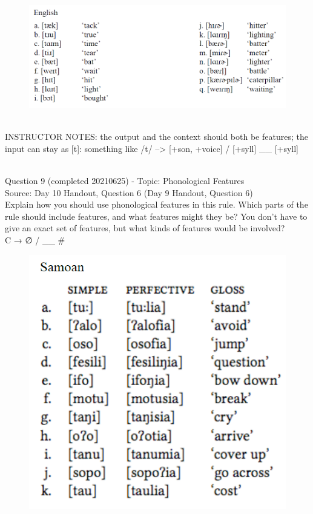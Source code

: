 \documentclass[12pt]{article}
\begin{document}
\begin{figure}[H]
\includegraphics{../images/english_t_flap.png}
\end{figure}

~\\
INSTRUCTOR NOTES: the output and the context should both be features; the input can stay as [t]: something like /t/ --> [+son, +voice] / [+syll] \_\_ [+syll]


~\\

{\large Question 9} (completed 20210625) - Topic: Phonological Features\\
Source: Day 10 Handout, Question 6 (Day 9 Handout, Question 6)\\

Explain how you should use phonological features in this rule. Which parts of the rule should include features, and what features might they be? You don't have to give an exact set of features, but what kinds of features would be involved?\\

C → ∅ / \_\_ \#

\begin{figure}[H]
\includegraphics{../images/samoan.png}
\end{figure}
\end{document}
